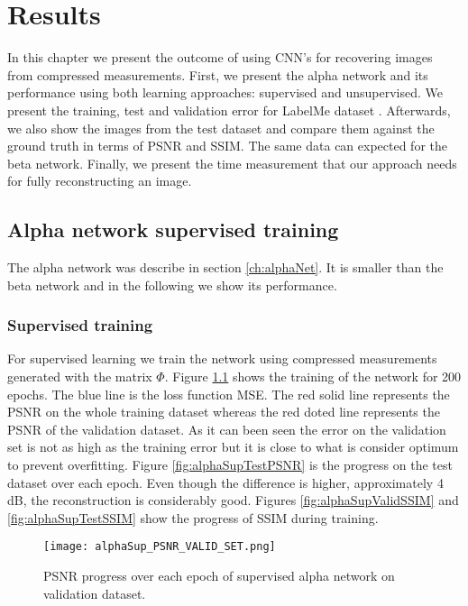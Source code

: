 \chapter{Results}
In this chapter we present the outcome of using CNN's for recovering images from compressed measurements. First, we present the alpha network and its performance using both learning approaches: supervised and unsupervised. We present the training, test and validation error for LabelMe dataset \cite{LFWTech}. Afterwards, we also show the images from the test dataset and compare them against the ground truth in terms of PSNR and SSIM. The same data can expected for the beta network. Finally, we present the time measurement that our approach needs for fully reconstructing an image.  

\section{Alpha network supervised training}
The alpha network was describe in section \ref{ch:alphaNet}. It is smaller than the beta network and in the following we show its performance.
\subsection{Supervised training}
For supervised learning we train the network using compressed measurements generated with the matrix $\Phi$. Figure \ref{fig:alphaSupValidPSNR} shows the training of the network for 200 epochs. The blue line is the loss function MSE. The red solid line represents the PSNR on the whole training dataset whereas the red doted line represents the PSNR of the validation dataset. As it can been seen the error on the validation set is not as high as the training error but it is close to what is consider optimum to prevent overfitting. Figure \ref{fig:alphaSupTestPSNR} is the progress on the test dataset over each epoch. Even though the difference is higher, approximately 4 dB, the reconstruction is considerably good. Figures \ref{fig:alphaSupValidSSIM} and \ref{fig:alphaSupTestSSIM} show the progress of SSIM during training. 
 
\begin{figure}[!htb]
\centering 
\texttt{[image: alphaSup\_PSNR\_VALID\_SET.png]}
\caption[PSNR validation progress during training of supervised alpha network]{PSNR progress over each epoch of supervised alpha network on validation dataset.}
\label{fig:alphaSupValidPSNR} 
\end{figure}  

